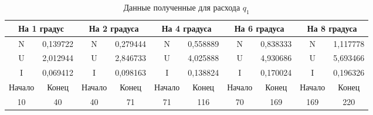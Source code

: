 \documentclass[a4paper, 12pt]{article}
\begin{document}
\begin{table}[!ht]
    \centering
\begin{tabular}{|cc|cc|cc|cc|cc|}
\hline
\multicolumn{2}{|c|}{На 1 градус}       & \multicolumn{2}{c|}{На 2 градуса}      & \multicolumn{2}{c|}{На 4 градуса}      & \multicolumn{2}{c|}{На 6 градуса}      & \multicolumn{2}{c|}{На 8 градуса}      \\ \hline
\multicolumn{1}{|c|}{N}      & 0,139722 & \multicolumn{1}{c|}{N}      & 0,279444 & \multicolumn{1}{c|}{N}      & 0,558889 & \multicolumn{1}{c|}{N}      & 0,838333 & \multicolumn{1}{c|}{N}      & 1,117778 \\ \hline
\multicolumn{1}{|c|}{U}      & 2,012944 & \multicolumn{1}{c|}{U}      & 2,846733 & \multicolumn{1}{c|}{U}      & 4,025888 & \multicolumn{1}{c|}{U}      & 4,930686 & \multicolumn{1}{c|}{U}      & 5,693466 \\ \hline
\multicolumn{1}{|c|}{I}      & 0,069412 & \multicolumn{1}{c|}{I}      & 0,098163 & \multicolumn{1}{c|}{I}      & 0,138824 & \multicolumn{1}{c|}{I}      & 0,170024 & \multicolumn{1}{c|}{I}      & 0,196326 \\ \hline
\multicolumn{1}{|c|}{Начало} & Конец    & \multicolumn{1}{c|}{Начало} & Конец    & \multicolumn{1}{c|}{Начало} & Конец    & \multicolumn{1}{c|}{Начало} & Конец    & \multicolumn{1}{c|}{Начало} & Конец    \\ \hline
\multicolumn{1}{|c|}{10}     & 40       & \multicolumn{1}{c|}{40}     & 71       & \multicolumn{1}{c|}{71}     & 116      & \multicolumn{1}{c|}{70}     & 169      & \multicolumn{1}{c|}{169}    & 220      \\ \hline
\end{tabular}
    \caption{Данные полученные для расхода $q_1$}
    \label{fig:table_to_this_foto}
\end{table}
\end{document}
